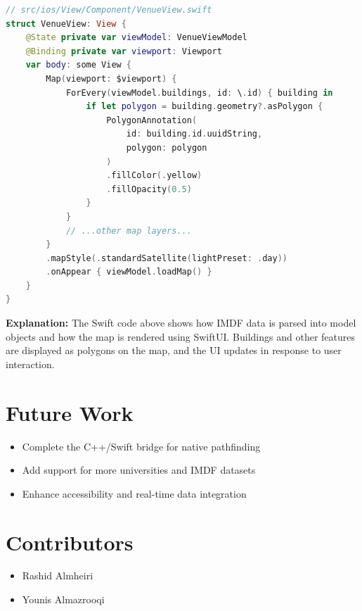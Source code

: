 \documentclass{article}
\begin{document}
\begin{lstlisting}[language=swift]
// src/ios/View/Component/VenueView.swift
struct VenueView: View {
    @State private var viewModel: VenueViewModel
    @Binding private var viewport: Viewport
    var body: some View {
        Map(viewport: $viewport) {
            ForEvery(viewModel.buildings, id: \.id) { building in
                if let polygon = building.geometry?.asPolygon {
                    PolygonAnnotation(
                        id: building.id.uuidString,
                        polygon: polygon
                    )
                    .fillColor(.yellow)
                    .fillOpacity(0.5)
                }
            }
            // ...other map layers...
        }
        .mapStyle(.standardSatellite(lightPreset: .day))
        .onAppear { viewModel.loadMap() }
    }
}
\end{lstlisting}

\textbf{Explanation:} The Swift code above shows how IMDF data is parsed into model objects and how the map is rendered using SwiftUI. Buildings and other features are displayed as polygons on the map, and the UI updates in response to user interaction.

\section{Future Work}
\begin{itemize}
    \item Complete the C++/Swift bridge for native pathfinding
    \item Add support for more universities and IMDF datasets
    \item Enhance accessibility and real-time data integration
\end{itemize}

\section{Contributors}
\begin{itemize}
    \item Rashid Almheiri
    \item Younis Almazrooqi
\end{itemize}
\end{document}

